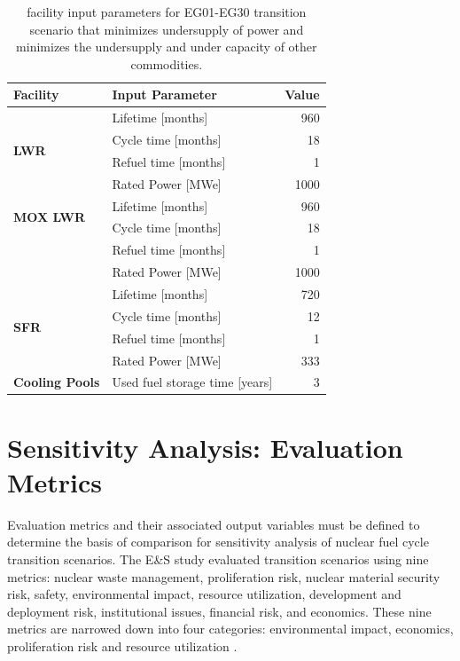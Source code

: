\begin{table}[]
    \centering
    \doublespacing
    \caption{\Cyclus facility input parameters for
	EG01-EG30 transition scenario
	that minimizes undersupply of power and minimizes 
	the undersupply and under capacity of other commodities. }
	\label{tab:facinputs}
    \small
    \begin{tabular}{llr}
        \hline
        \textbf{Facility}                 & \textbf{Input Parameter}                    & \textbf{Value} \\ \hline
        \multirow{4}{*}{\textbf{LWR}}     & Lifetime {[}months{]}              & 960   \\
                                 & Cycle time {[}months{]}            & 18    \\
                                 & Refuel time {[}months{]}           & 1     \\
                                 & Rated Power {[}MWe{]}              & 1000  \\ \hline
        \multirow{2}{*}{\textbf{MOX LWR}} & Lifetime {[}months{]}              & 960   \\
                                 & Cycle time {[}months{]}            & 18    \\
                                 & Refuel time {[}months{]}           & 1     \\
                                 & Rated Power {[}MWe{]}              & 1000  \\ \hline
        \multirow{4}{*}{\textbf{SFR}}     & Lifetime {[}months{]}              & 720   \\
                                 & Cycle time {[}months{]}            & 12    \\
                                 & Refuel time {[}months{]}           & 1     \\
                                 & Rated Power {[}MWe{]}              & 333   \\ \hline
        \textbf{Cooling Pools}            & Used fuel storage time {[}years{]} & 3  \\ \hline
        \end{tabular}
    \end{table}

\section{Sensitivity Analysis: Evaluation Metrics}
Evaluation metrics and their associated output variables 
must be defined to determine the basis of comparison for sensitivity 
analysis of nuclear fuel cycle transition scenarios.
The E\&S study \cite{wigeland_nuclear_2014} evaluated transition 
scenarios using nine metrics: nuclear waste 
management, proliferation risk, nuclear material security risk, 
safety, environmental impact, resource utilization, development 
and deployment risk, institutional issues, financial risk, and 
economics. 
These nine metrics are narrowed down into four categories: environmental 
impact, economics, proliferation risk and resource utilization
\cite{passerini_systematic_2014}. 

